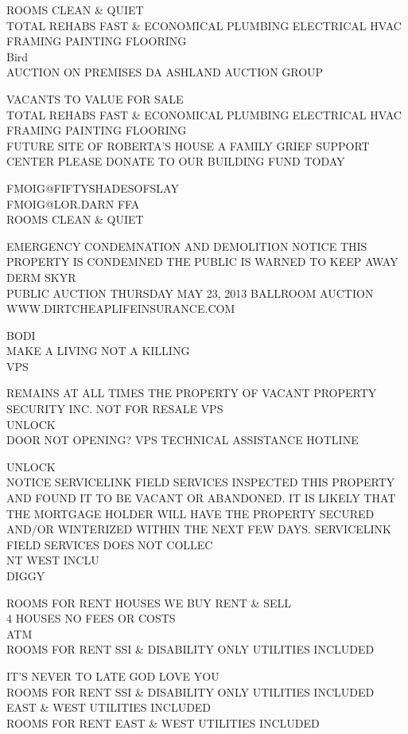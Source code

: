 \documentclass[10pt,letterpaper]{article}
\begin{document}
ROOMS CLEAN \& QUIET\\
TOTAL REHABS FAST \& ECONOMICAL PLUMBING ELECTRICAL HVAC FRAMING PAINTING FLOORING\\
Bird\\
AUCTION ON PREMISES DA ASHLAND AUCTION GROUP

VACANTS TO VALUE FOR SALE\\
TOTAL REHABS FAST \& ECONOMICAL PLUMBING ELECTRICAL HVAC FRAMING PAINTING FLOORING\\
FUTURE SITE OF ROBERTA'S HOUSE A FAMILY GRIEF SUPPORT CENTER PLEASE DONATE TO OUR BUILDING FUND TODAY

FMOIG@FIFTYSHADESOFSLAY\\
FMOIG@LOR.DARN FFA\\
ROOMS CLEAN \& QUIET

EMERGENCY CONDEMNATION AND DEMOLITION NOTICE THIS PROPERTY IS CONDEMNED THE PUBLIC IS WARNED TO KEEP AWAY\\
DERM SKYR\\
PUBLIC AUCTION THURSDAY MAY 23, 2013 BALLROOM AUCTION\\
WWW.DIRTCHEAPLIFEINSURANCE.COM

BODI\\
MAKE A LIVING NOT A KILLING\\
VPS

REMAINS AT ALL TIMES THE PROPERTY OF VACANT PROPERTY SECURITY INC. NOT FOR RESALE VPS\\
UNLOCK\\
DOOR NOT OPENING?  VPS TECHNICAL ASSISTANCE HOTLINE

UNLOCK\\
NOTICE SERVICELINK FIELD SERVICES INSPECTED THIS PROPERTY AND FOUND IT TO BE VACANT OR ABANDONED.  IT IS LIKELY THAT THE MORTGAGE HOLDER WILL HAVE THE PROPERTY SECURED AND/OR WINTERIZED WITHIN THE NEXT FEW DAYS.  SERVICELINK FIELD SERVICES DOES NOT COLLEC\\
NT WEST INCLU\\
DIGGY

ROOMS FOR RENT HOUSES WE BUY RENT \& SELL\\
4 HOUSES NO FEES OR COSTS\\
ATM\\
ROOMS FOR RENT SSI \& DISABILITY ONLY UTILITIES INCLUDED

IT'S NEVER TO LATE GOD LOVE YOU\\
ROOMS FOR RENT SSI \& DISABILITY ONLY UTILITIES INCLUDED\\
EAST \& WEST UTILITIES INCLUDED\\
ROOMS FOR RENT EAST \& WEST UTILITIES INCLUDED
\end{document}

